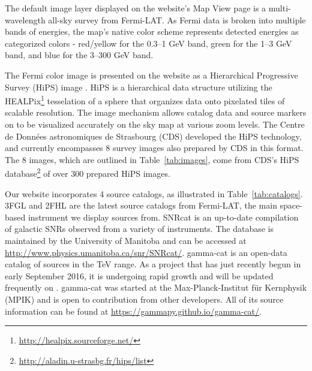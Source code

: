 %

The default image layer displayed on the website's Map View page is a multi-wavelength all-sky survey from Fermi-LAT. As Fermi data is broken into multiple bands of energies, the map's native color scheme represents detected energies as categorized colors - red/yellow for the 0.3--1 GeV band, green for the 1--3 GeV band, and blue for the 3--300 GeV band.

 The Fermi color image is presented on the website as a Hierarchical Progressive Survey (HiPS) image \cite{hips}. HiPS is a hierarchical data structure utilizing the HEALPix\footnote[4]{\url{http://healpix.sourceforge.net/}} tesselation of a sphere that organizes data onto pixelated tiles of scalable resolution. The image mechanism allows catalog data and source markers on \gammasky to be visualized accurately on the sky map at various zoom levels. The Centre de Donn\'{e}es astronomiques de Strasbourg (CDS) developed the HiPS technology, and \gammasky currently encompasses 8 survey images also prepared by CDS in this format. The 8 images, which are outlined in Table~\ref{tab:images}, come from CDS's HiPS database\footnote[5]{\url{http://aladin.u-strasbg.fr/hips/list}} of over 300 prepared HiPS images.

Our website incorporates 4 source catalogs, as illustrated in Table~\ref{tab:catalogs}. 3FGL \cite{3fgl} and 2FHL \cite{2fhl} are the latest source catalogs from Fermi-LAT, the main space-based instrument we display sources from. SNRcat \cite{snrcat} is an up-to-date compilation of galactic SNRs observed from a variety of instruments. The database is maintained by the University of Manitoba and can be accessed at \url{http://www.physics.umanitoba.ca/snr/SNRcat/}. gamma-cat is an open-data catalog of sources in the TeV range. As a project that has just recently begun in early September 2016, it is undergoing rapid growth and will be updated frequently on \gammasky. gamma-cat was started at the Max-Planck-Institut f\"{u}r Kernphysik (MPIK) and is open to contribution from other developers. All of its source information can be found at \url{https://gammapy.github.io/gamma-cat/}.

